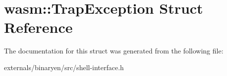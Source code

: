 \hypertarget{structwasm_1_1_trap_exception}{}\section{wasm\+:\+:Trap\+Exception Struct Reference}
\label{structwasm_1_1_trap_exception}


The documentation for this struct was generated from the following file\+:\begin{DoxyCompactItemize}
\item 
externals/binaryen/src/shell-\/interface.\+h\end{DoxyCompactItemize}
